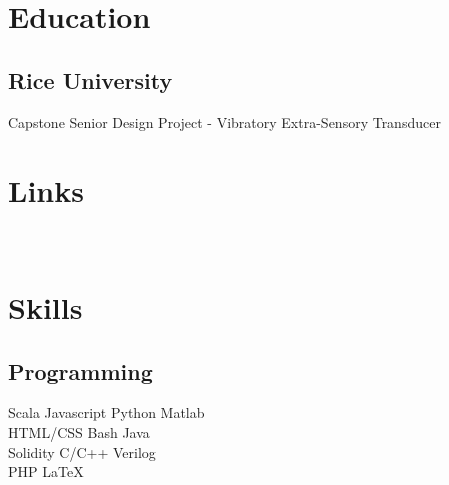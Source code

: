 \documentclass[]{deedy-resume-openfont}
\begin{document}
%
%

%
%



%
%

\begin{minipage}[t]{0.25\textwidth} 


\section{Education}

\subsection{Rice University}
Capstone Senior Design Project - Vibratory Extra-Sensory Transducer \\
\sectionsep


\section{Links} 
\href{https://github.com/zihehuang}{} \\
\href{https://www.linkedin.com/in/zihe-huang-01897431/}{}

\section{Skills}
\subsection{Programming}
Scala \textbullet{} Javascript \textbullet{} Python
Matlab \\
HTML/CSS \textbullet{} Bash \textbullet{} Java\\
Solidity \textbullet{} C/C++ \textbullet{} Verilog\\
PHP \textbullet{} \LaTeX\ 
\sectionsep


\end{minipage}
\end{document}
